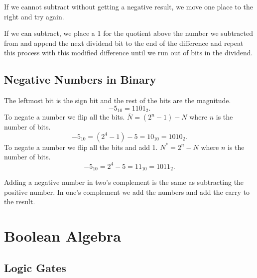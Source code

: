 \documentclass{report}
\begin{document}
If we cannot subtract without getting a negative result, we move one place to the right and try again.

If we can subtract, we place a 1 for the quotient above the number we subtracted from and append the next dividend bit to the end of the difference and repeat this process with this modified difference until we run out of bits in the dividend.

\section{Negative Numbers in Binary}

\begin{description}
	 The leftmost bit is the sign bit and the rest of the bits are the magnitude.
	\[
		-5_{10} = 1101_{2}
		.\]
	 To negate a number we flip all the bits. $\bar{N} = (2^n-1) - N$ where $n$ is the number of bits.
	\[
		-5_{10} = (2^4 - 1) - 5 = 10_{10} = 1010_2
		.\]
	 To negate a number we flip all the bits and add 1. $N^* = 2^n - N$ where $n$ is the number of bits.
	\[
		-5_{10} = 2^4 - 5 = 11_{10} = 1011_2
		.\]
\end{description}

Adding a negative number in two's complement is the same as subtracting the positive number. In one's complement we add the numbers and add the carry to the result.

\chapter{Boolean Algebra}

\section{Logic Gates}
\end{document}
